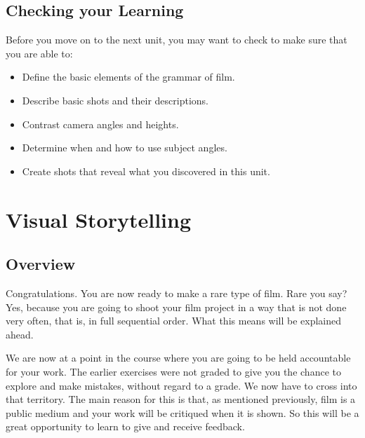 \documentclass[
]{book}
\providecommand{\tightlist}{%
  \setlength{\itemsep}{0pt}\setlength{\parskip}{0pt}}
\begin{document}
\hypertarget{checking-your-learning-4}{%
\section*{Checking your Learning}\label{checking-your-learning-4}}

\begin{progress}
Before you move on to the next unit, you may want to check to make sure that you are able to:

\begin{itemize}
\tightlist
\item
  Define the basic elements of the grammar of film.\\
\item
  Describe basic shots and their descriptions.\\
\item
  Contrast camera angles and heights.\\
\item
  Determine when and how to use subject angles.\\
\item
  Create shots that reveal what you discovered in this unit.
\end{itemize}
\end{progress}

\hypertarget{visual-storytelling}{%
\chapter{Visual Storytelling}\label{visual-storytelling}}

\hypertarget{overview-5}{%
\section*{Overview}\label{overview-5}}

Congratulations. You are now ready to make a rare type of film. Rare you say? Yes, because you are going to shoot your film project in a way that is not done very often, that is, in full sequential order. What this means will be explained ahead.

We are now at a point in the course where you are going to be held accountable for your work. The earlier exercises were not graded to give you the chance to explore and make mistakes, without regard to a grade. We now have to cross into that territory. The main reason for this is that, as mentioned previously, film is a public medium and your work will be critiqued when it is shown. So this will be a great opportunity to learn to give and receive feedback.
\end{document}
